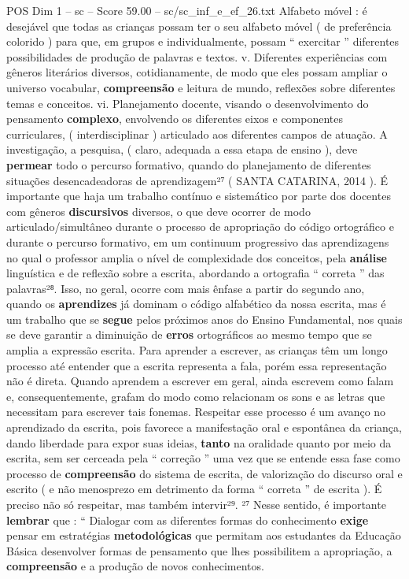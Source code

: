 \begin{textsample}{POS Dim 1 – sc – Score 59.00 – sc/sc\_inf\_e\_ef\_26.txt}
Alfabeto móvel : é desejável que todas as crianças possam ter o seu alfabeto móvel ( de preferência colorido ) para que, em grupos e individualmente, possam “ exercitar ” diferentes possibilidades de produção de palavras e textos. v.
Diferentes experiências com gêneros literários diversos, cotidianamente, de modo que eles possam ampliar o universo vocabular, \textbf{compreensão} e leitura de mundo, reflexões sobre diferentes temas e conceitos. vi.
Planejamento docente, visando o desenvolvimento do pensamento \textbf{complexo}, envolvendo os diferentes eixos e componentes curriculares, ( interdisciplinar ) articulado aos diferentes campos de atuação.
A investigação, a pesquisa, ( claro, adequada a essa etapa de ensino ), deve \textbf{permear} todo o percurso formativo, quando do planejamento de diferentes situações desencadeadoras de aprendizagem²⁷ ( SANTA CATARINA, 2014 ).
É importante que haja um trabalho contínuo e sistemático por parte dos docentes com gêneros \textbf{discursivos} diversos, o que deve ocorrer de modo articulado/simultâneo durante o processo de apropriação do código ortográfico e durante o percurso formativo, em um continuum progressivo das aprendizagens no qual o professor amplia o nível de complexidade dos conceitos, pela \textbf{análise} linguística e de reflexão sobre a escrita, abordando a ortografia “ correta ” das palavras²⁸.
Isso, no geral, ocorre com mais ênfase a partir do segundo ano, quando os \textbf{aprendizes} já dominam o código alfabético da nossa escrita, mas é um trabalho que se \textbf{segue} pelos próximos anos do Ensino Fundamental, nos quais se deve garantir a diminuição de \textbf{erros} ortográficos ao mesmo tempo que se amplia a expressão escrita.
Para aprender a escrever, as crianças têm um longo processo até entender que a escrita representa a fala, porém essa representação não é direta.
Quando aprendem a escrever em geral, ainda escrevem como falam e, consequentemente, grafam do modo como relacionam os sons e as letras que necessitam para escrever tais fonemas.
Respeitar esse processo é um avanço no aprendizado da escrita, pois favorece a manifestação oral e espontânea da criança, dando liberdade para expor suas ideias, \textbf{tanto} na oralidade quanto por meio da escrita, sem ser cerceada pela “ correção ” uma vez que se entende essa fase como processo de \textbf{compreensão} do sistema de escrita, de valorização do discurso oral e escrito ( e não menosprezo em detrimento da forma “ correta ” de escrita ).
É preciso não só respeitar, mas também intervir²⁹. ²⁷ Nesse sentido, é importante \textbf{lembrar} que : “ Dialogar com as diferentes formas do conhecimento \textbf{exige} pensar em estratégias \textbf{metodológicas} que permitam aos estudantes da Educação Básica desenvolver formas de pensamento que lhes possibilitem a apropriação, a \textbf{compreensão} e a produção de novos conhecimentos.

\end{textsample}
